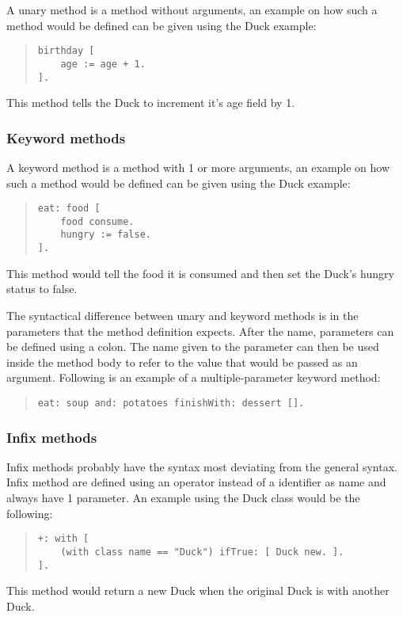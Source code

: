 \documentclass[a4paper]{article}
\begin{document}
A unary method is a method without arguments, an example on how such a method would be defined can be given using the Duck example:

\begin{quote}
\begin{lstlisting}
birthday [
	age := age + 1.
].
\end{lstlisting}
\end{quote}
This method tells the Duck to increment it's age field by 1.

\subsubsection{Keyword methods}
A keyword method is a method with 1 or more arguments, an example on how such a method would be defined can be given using the Duck example:

\begin{quote}
\begin{lstlisting}
eat: food [
	food consume.
	hungry := false.
].
\end{lstlisting}
\end{quote}
This method would tell the food it is consumed and then set the Duck's hungry status to false.

The syntactical difference between unary and keyword methods is in the parameters that the method definition expects. After the name, parameters can be defined using a colon. The name given to the parameter can then be used inside the method body to refer to the value that would be passed as an argument. Following is an example of a multiple-parameter keyword method:

\begin{quote}
\begin{lstlisting}
eat: soup and: potatoes finishWith: dessert [].
\end{lstlisting}
\end{quote}

\subsubsection{Infix methods}

Infix methods probably have the syntax most deviating from the general syntax. Infix method are defined using an operator instead of a identifier as name and always have 1 parameter. An example using the Duck class would be the following:

\begin{quote}
\begin{lstlisting}
+: with [
	(with class name == "Duck") ifTrue: [ Duck new. ].
].
\end{lstlisting}
\end{quote}
This method would return a new Duck when the original Duck is with another Duck.
\end{document}
